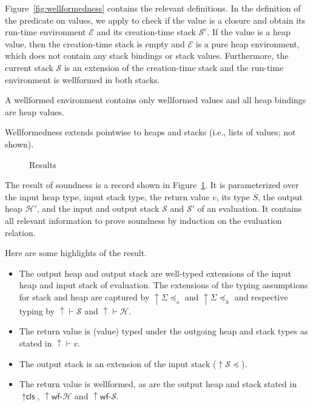 \documentclass[sigplan,review,dvipsnames,screen,10pt]{acmart}
\begin{document}
Figure~\ref{fig:wellformedness} contains the relevant definitions. In
the definition of the {\AWellformed} predicate on values, we apply
 to check if the value
is a closure and obtain its run-time environment $\mathcal{E}$ and its
creation-time stack $\mathcal{S}^c$. If the value is a heap value,
then the creation-time stack is empty and $\mathcal{E}$ is a pure heap
environment, which does not contain any stack bindings or stack
values. Furthermore, the current stack $\mathcal{S}$ is an 
extension of the creation-time stack and the run-time environment is
wellformed in both stacks.

A wellformed environment {\AWellformedEnv} contains only wellformed values and all heap
bindings are heap values.

Wellformedness extends pointwise to heaps and stacks (i.e., lists
of values; not shown).

\begin{figure}[tp]
  \SoundnessResult
  \caption{Results}
  \label{fig:soundness-result}
\end{figure}
The result of soundness is a record shown in
Figure~\ref{fig:soundness-result}.
It is parameterized over the input heap type, input stack type, the
return value $v$, its type $S$, the output heap $\mathcal{H}'$, and
the input and output stack $\mathcal{S}$ and $\mathcal{S}'$ of an
evaluation. It contains all relevant information to prove soundness by
induction on the evaluation relation.

Here are some highlights of the result.
\begin{itemize}
\item The output heap and output stack are well-typed extensions of
  the input heap and input stack of evaluation. The extensions of the
  typing assumptions for stack and heap are captured by
  ${\uparrow}\Sigma{\preceq_s}$ and  ${\uparrow}\Sigma{\preceq_h}$ and
  respective typing by ${\uparrow}{\vdash}\mathcal{S}$ and
  ${\uparrow}{\vdash}\mathcal{H}$.
\item The return value is (value) typed under the outgoing heap and
  stack types as stated in ${\uparrow}{\vdash} v$.
\item The output stack is an extension of the input stack (${\uparrow}\mathcal{S}{\preceq}$).
\item The return value is wellformed, as are the output heap and stack
  stated in ${\uparrow}\textsf{cls}$, ${\uparrow}\textsf{wf-}\mathcal{H}$ and ${\uparrow}\textsf{wf-}\mathcal{S}$.
\end{itemize}
\end{document}
